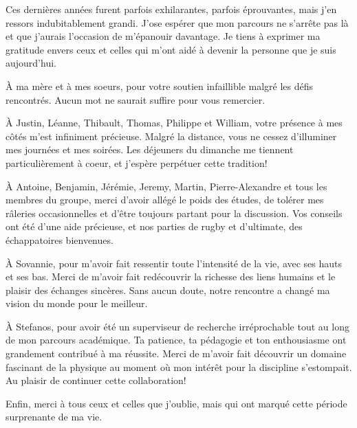 \begin{comment}
\end{comment}

Ces dernières années furent parfois exhilarantes, parfois éprouvantes, mais j'en ressors indubitablement grandi. J'ose espérer que mon parcours ne s'arrête pas là et que j'aurais l'occasion de m'épanouir davantage. Je tiens à exprimer ma gratitude envers ceux et celles qui m'ont aidé à devenir la personne que je suis aujourd'hui.

À ma mère et à mes soeurs, pour votre soutien infaillible malgré les défis rencontrés. Aucun mot ne saurait suffire pour vous remercier.

À Justin, Léanne, Thibault, Thomas, Philippe et William, votre présence à mes côtés m'est infiniment précieuse. Malgré la distance, vous ne cessez d'illuminer mes journées et mes soirées. Les déjeuners du dimanche me tiennent particulièrement à coeur, et j'espère perpétuer cette tradition!

À Antoine, Benjamin, Jérémie, Jeremy, Martin, Pierre-Alexandre et tous les membres du groupe, merci d'avoir allégé le poids des études, de tolérer mes râleries occasionnelles et d'être toujours partant pour la discussion. Vos conseils ont été d'une aide précieuse, et nos parties de rugby et d'ultimate, des échappatoires bienvenues.

À Sovannie, pour m'avoir fait ressentir toute l'intensité de la vie, avec ses hauts et ses bas. Merci de m'avoir fait redécouvrir la richesse des liens humains et le plaisir des échanges sincères. Sans aucun doute, notre rencontre a changé ma vision du monde pour le meilleur.

À Stefanos, pour avoir été un superviseur de recherche irréprochable tout au long de mon parcours académique. Ta patience, ta pédagogie et ton enthousiasme ont grandement contribué à ma réussite. Merci de m'avoir fait découvrir un domaine fascinant de la physique au moment où mon intérêt pour la discipline s'estompait. Au plaisir de continuer cette collaboration!

Enfin, merci à tous ceux et celles que j'oublie, mais qui ont marqué cette période surprenante de ma vie.

